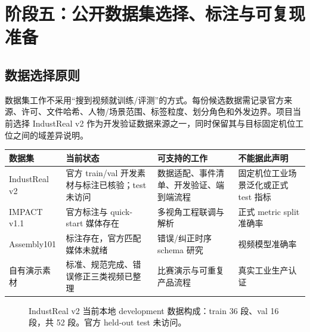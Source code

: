 \documentclass[UTF8,11pt,a4paper]{ctexart}
\begin{document}
\section{阶段五：公开数据集选择、标注与可复现准备}
\subsection{数据选择原则}
数据集工作不采用“搜到视频就训练/评测”的方式。每份候选数据需记录官方来源、许可、文件哈希、人物/场景范围、标签粒度、划分角色和外发边界。项目当前选择 IndustReal v2 作为开发验证数据来源之一，同时保留其与目标固定机位工位之间的域差异说明。

\begin{center}
\begin{tabularx}{\textwidth}{@{}p{31mm}p{25mm}Y Y@{}}
\toprule
\textbf{数据集} & \textbf{当前状态} & \textbf{可支持的工作} & \textbf{不能据此声明}\\
\midrule
IndustReal v2 & 官方 train/val 开发素材与标注已核验；test 未访问 & 数据适配、事件清单、开发验证、端到端流程 & 固定机位工业场景泛化或正式 test 指标\\
IMPACT v1.1 & 官方标注与 quick-start 媒体存在 & 多视角工程联调与解析 & 正式 metric split 准确率\\
Assembly101 & 标注存在，官方匹配媒体未就绪 & 错误/纠正时序 schema 研究 & 视频模型准确率\\
自有演示素材 & 标准、规范完成、错误修正三类视频已整理 & 比赛演示与可重复产品流程 & 真实工业生产认证\\
\bottomrule
\end{tabularx}
\end{center}

\begin{figure}[H]
\centering
{}
\caption{IndustReal v2 当前本地 development 数据构成：train 36 段、val 16 段，共 52 段。官方 held-out test 未访问。}
\end{figure}
\end{document}

